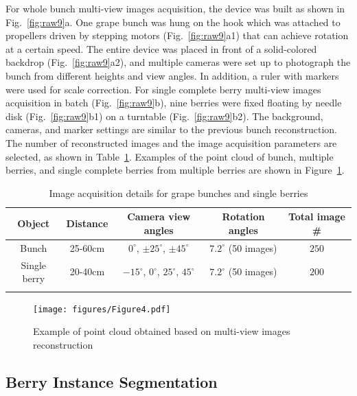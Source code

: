 \documentclass[12pt]{article}
\begin{document}
For whole bunch multi-view images acquisition, the device was built as shown in Fig.~\ref{fig:raw9}a. 
One grape bunch was hung on the hook which was attached to propellers driven by stepping motors (Fig.~\ref{fig:raw9}a1) that can achieve rotation at a certain speed. 
The entire device was placed in front of a solid-colored backdrop (Fig.~\ref{fig:raw9}a2), and multiple cameras were set up to photograph the bunch from different heights and view angles. 
In addition, a ruler with markers were used for scale correction. 
For single complete berry multi-view images acquisition in batch (Fig.~\ref{fig:raw9}b), 
nine berries were fixed floating by needle disk (Fig.~\ref{fig:raw9}b1) on a turntable (Fig.~\ref{fig:raw9}b2). 
The background, cameras, and marker settings are similar to the previous bunch reconstruction. 
The number of reconstructed images and the image acquisition parameters are selected, as shown in Table~\ref{tbl:2}. 
Examples of the point cloud of bunch, multiple berries, and single complete berries from multiple berries are shown in Figure~\ref{fig:raw10}.

\begin{table}[h]
    \centering
    \caption{Image acquisition details for grape bunches and single berries}
    \begin{tabular}{ccccc}
        \hline
        \textbf{Object} & \textbf{Distance} & \textbf{Camera view angles} & \textbf{Rotation angles} &  \textbf{Total image \#} \\
        \hline
        Bunch        & 25-60cm & $0^{\circ}$, $\pm 25^{\circ}$, $\pm 45^{\circ}$ & $7.2^{\circ}$ (50 images) & $250$ \\
        Single berry & 20-40cm & $-15^{\circ}$, $0^{\circ}$, $25^{\circ}$, $45^{\circ}$ & $7.2^{\circ}$ (50 images) & $200$ \\
        \hline
    \label{tbl:2}
    \end{tabular}
\end{table}

\begin{figure}[hbt!]
    \centering
    \texttt{[image: figures/Figure4.pdf]}
    \caption{Example of point cloud obtained based on multi-view images reconstruction}
    \label{fig:raw10}
\end{figure}

\subsection{Berry Instance Segmentation}
\label{sec:22}
\end{document}
